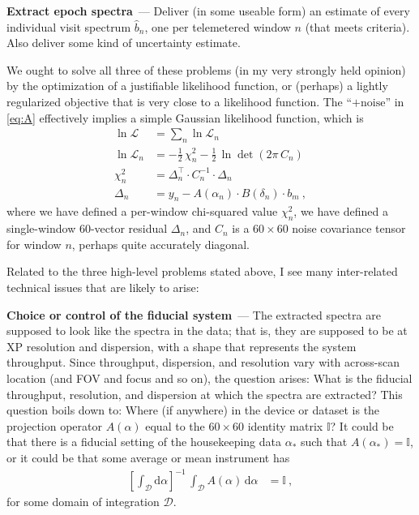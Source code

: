 \documentclass[11pt]{article}
\renewcommand{\paragraph}[1]{\medskip\par\noindent\textbf{#1}~---}
\newcommand{\dd}{\mathrm{d}}
\begin{document}
\paragraph{Extract epoch spectra}
Deliver (in some useable form) an estimate of every individual visit spectrum $\hat{b}_n$, one per telemetered window $n$ (that meets criteria). Also deliver some kind of uncertainty estimate.

\medskip

We ought to solve all three of these problems (in my very strongly held opinion) by the optimization of a justifiable likelihood function, or (perhaps) a lightly regularized objective that is very close to a likelihood function.
The ``$+\mbox{noise}$'' in \eqref{eq:A} effectively implies a simple Gaussian likelihood function, which is
\begin{align}
    \ln\mathscr{L} &= \sum_n \ln\mathscr{L}_n \label{eq:lf1}\\
    \ln\mathscr{L}_n &= -\frac{1}{2}\,\chi^2_n - \frac{1}{2}\,\ln\det(2\pi\,C_n)\\
    \chi^2_n &= \Delta_n^\top\cdot C_n^{-1}\cdot \Delta_n \\
    \Delta_n &= y_n - A(\alpha_n)\cdot B(\delta_n)\cdot b_m ~,\label{eq:lf2}
\end{align}
where we have defined a per-window chi-squared value $\chi^2_n$,
we have defined a single-window 60-vector residual $\Delta_n$,
and $C_n$ is a $60\times 60$ noise covariance tensor for window $n$, perhaps quite accurately diagonal.

Related to the three high-level problems stated above, I see many inter-related technical issues that are likely to arise:

\paragraph{Choice or control of the fiducial system}
The extracted spectra are supposed to look like the spectra in the data; that is, they are supposed to be at XP resolution and dispersion, with a shape that represents the system throughput.
Since throughput, dispersion, and resolution vary with across-scan location (and FOV and focus and so on), the question arises:
What is the fiducial throughput, resolution, and dispersion at which the spectra are extracted?
This question boils down to:
Where (if anywhere) in the device or dataset is the projection operator $A(\alpha)$ equal to the $60\times 60$ identity matrix $\mathbb{I}$?
It could be that there is a fiducial setting of the housekeeping data $\alpha_\ast$ such that $A(\alpha_\ast)=\mathbb{I}$, or it could be that some average or mean instrument has
\begin{align}
    \left[\int_\mathscr{D} \dd\alpha\right]^{-1}\,\displaystyle\int_\mathscr{D} A(\alpha)\,\dd\alpha  &= \mathbb{I} ~,\label{eq:meanA}
\end{align}
for some domain of integration $\mathscr{D}$.
\end{document}
